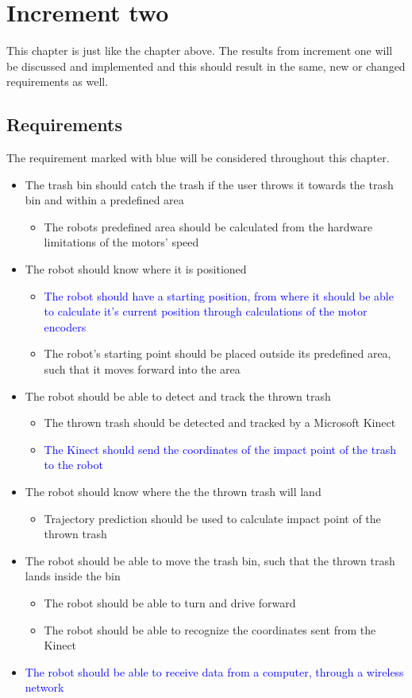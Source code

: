\chapter{Increment two}
\label{chap:Increment two}
This chapter is just like the chapter above. The results from increment one will be discussed and implemented and this should result in the same, new or changed requirements as well.  

\section{Requirements}
\label{sec:i2Requirements}
The requirement marked with blue will be considered throughout this chapter.

\begin{itemize}
	\item The trash bin should catch the trash if the user throws it towards the trash bin and within a predefined area
	\begin{itemize}
		\item {The robots predefined area should be calculated from the hardware limitations of the motors’ speed}
	\end{itemize}
	\item The robot should know where it is positioned
	\begin{itemize}
		\item \textcolor{blue}{The robot should have a starting position, from where it should be able to calculate it's current position through calculations of the motor encoders}
		\item {The robot's starting point should be placed outside its predefined area, such that it moves forward into the area}
	\end{itemize}
	\item The robot should be able to detect and track the thrown trash
	\begin{itemize}
		\item {The thrown trash should be detected and tracked by a Microsoft Kinect}
		\item \textcolor{blue}{The Kinect should send the coordinates of the impact point of the trash to the robot}
	\end{itemize}
	\item The robot should know where the the thrown trash will land
	\begin{itemize}
		\item {Trajectory prediction should be used to calculate impact point of the thrown trash}
	\end{itemize}
	\item The robot should be able to move the trash bin, such that the thrown trash lands inside the bin
	\begin{itemize}
		\item {The robot should be able to turn and drive forward}
		\item {The robot should be able to recognize the coordinates sent from the Kinect}
	\end{itemize}
	\item \textcolor{blue}{The robot should be able to receive data from a computer, through a wireless network}
\end{itemize}

